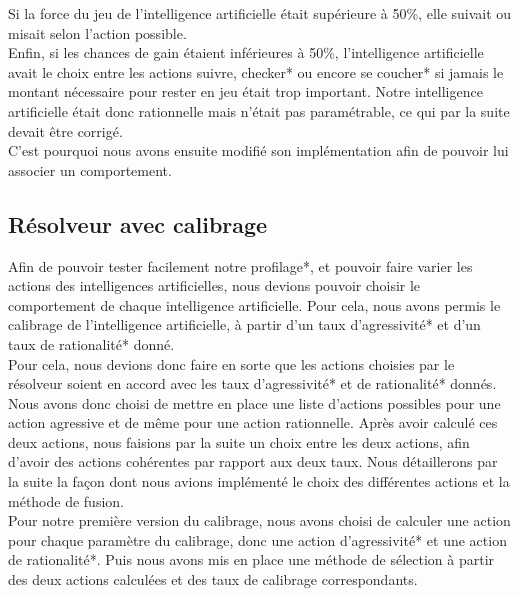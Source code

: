 \documentclass{report}
\begin{document}
Si la force du jeu de l'intelligence artificielle était supérieure à 50\%, elle suivait ou misait selon l'action possible.\\

Enfin, si les chances de gain étaient inférieures à 50\%, l'intelligence artificielle avait le choix entre les actions suivre, checker* ou encore se coucher* si jamais le montant nécessaire pour rester en jeu était trop important. Notre intelligence artificielle était donc rationnelle mais n'était pas paramétrable, ce qui par la suite devait être corrigé. \\
C'est pourquoi nous avons ensuite modifié son implémentation afin de pouvoir lui associer un comportement.\par


\subsection{Résolveur avec calibrage}

\hspace{0.5cm}Afin de pouvoir tester facilement notre profilage*, et pouvoir faire varier les actions des intelligences artificielles, nous devions pouvoir choisir le comportement de chaque intelligence artificielle. Pour cela, nous avons permis le calibrage de l'intelligence artificielle, à partir d'un taux d'agressivité* et d'un taux de rationalité* donné.\\

Pour cela, nous devions donc faire en sorte que les actions choisies par le résolveur soient en accord avec les taux d'agressivité* et de rationalité* donnés. Nous avons donc choisi de mettre en place une liste d'actions possibles pour une action agressive et de même pour une action rationnelle. Après avoir calculé ces deux actions, nous faisions par la suite un choix entre les deux actions, afin d'avoir des actions cohérentes par rapport aux deux taux. Nous détaillerons par la suite la façon dont nous avions implémenté le choix des différentes actions et la méthode de fusion.\\

Pour notre première version du calibrage, nous avons choisi de calculer une action pour chaque paramètre du calibrage, donc une action d'agressivité* et une action de rationalité*. Puis nous avons mis en place une méthode de sélection à partir des deux actions calculées et des taux de calibrage correspondants.\\
\end{document}
